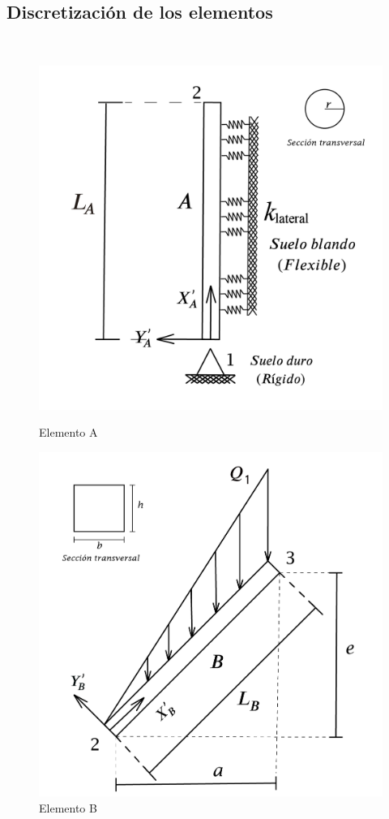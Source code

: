 \documentclass[a4paper]{article}
\begin{document}
\subsection{Discretización de los elementos}
\\
\begin{figure}[htp]
  \centering
  \begin{minipage}[b]{0.4\textwidth}
    \includegraphics[width=\textwidth]{Elementos/Elemento_A.png}
    \caption{Elemento A}
  \end{minipage}
  \hfill
  \begin{minipage}[b]{0.4\textwidth}
    \includegraphics[width=\textwidth]{Elementos/Elemento_B.png}
    \caption{Elemento B}
  \end{minipage}
\end{figure}
\end{document}
